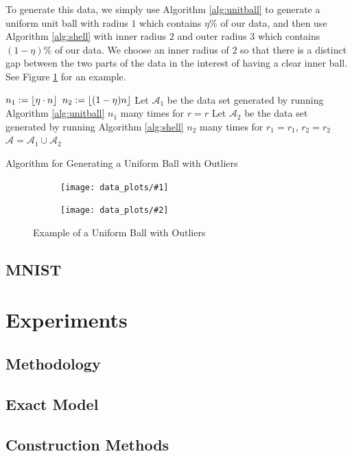 \documentclass[11pt,twoside]{report}
\newcommand{\A}{\mathcal{A}} %
\newcommand{\datafigure}[4]{
    \begin{figure}
    \centering
    \begin{subfigure}[b]{0.3333\textwidth}
        \centering
        \texttt{[image: data\_plots/\#1]}
    \end{subfigure}
    \begin{subfigure}[b]{0.3333\textwidth}
        \centering
        \texttt{[image: data\_plots/\#2]}
    \end{subfigure}
    \hfill
    \caption{#3}
    \label{#4}
\end{figure}
}
\DeclarePairedDelimiter\floor{\lfloor}{\rfloor}
\theoremstyle{definition}
\numberwithin{theorem}{section}
\numberwithin{definition}{section}
\numberwithin{lemma}{section}
\numberwithin{proposition}{section}
\numberwithin{equation}{section}
\numberwithin{figure}{section}
\begin{document}
To generate this data, we simply use Algorithm \ref{alg:unitball} to generate a uniform unit ball with radius $1$ which contains $\eta\%$ of our data, and then use Algorithm \ref{alg:shell} with inner radius $2$ and outer radius $3$ which contains $(1-\eta)\%$ of our data. We choose an inner radius of $2$ so that there is a distinct gap between the two parts of the data in the interest of having a clear inner ball. See Figure \ref{fig:unifballoutliers} for an example.

\begin{algorithm}
    \KwOut{Data set $\A\subseteq\mathbb{R}^d$}
    
    $n_1:=\floor{\eta\cdot n}$\;
    $n_2:=\floor{(1-\eta)n}$\;
    Let $\A_1$ be the data set generated by running Algorithm \ref{alg:unitball} $n_1$ many times for $r=r$\;
    Let $\A_2$ be the data set generated by running Algorithm \ref{alg:shell} $n_2$ many times for $r_1=r_1$, $r_2=r_2$\;
    $\A=\A_1\cup\A_2$\;
    \KwRet{$\A$}
    
    \caption{Algorithm for Generating a Uniform Ball with Outliers}
    \label{alg:unifballoutliers}
\end{algorithm}

\datafigure{uniform_ball_with_outliers_2d.png}{uniform_ball_with_outliers_3d.png}{Example of a Uniform Ball with Outliers}{fig:unifballoutliers}

\subsection{MNIST}

\section{Experiments}
\subsection{Methodology}
\subsection{Exact Model}\label{exact benchmarks}
\subsection{Construction Methods}
\end{document}
